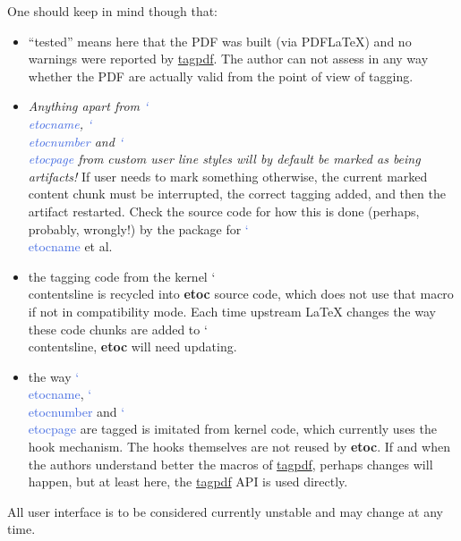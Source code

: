 \documentclass{article}
\DeclareRobustCommand\csa [1]
                {{\ttfamily\hyphenchar\font45 \char`\\ #1}}
\def\csb#1{\textcolor{RoyalBlue}{\csa{#1}}}
\newcommand\etoc{%
        \texorpdfstring{{\color{joli}\ttfamily\bfseries etoc}}{etoc}\xspace}
\DeclareRobustCommand\ctanpkg[1]
      {\texorpdfstring{\href{https://ctan.org/pkg/#1}{#1}}{#1}}
\begin{document}
\begin{itemize}
  One should keep in mind though that:
  \begin{itemize}
  \item ``tested'' means here that the PDF was built (via PDF\LaTeX) and
    no warnings were reported by \ctanpkg{tagpdf}.  The author can not
    assess in any way whether the PDF are actually valid from the point
    of view of tagging.
  \item \emph{Anything apart from \emph{\csb{etocname}},
      \emph{\csb{etocnumber}} and \emph{\csb{etocpage}} from custom user
      line styles will by default be marked as being artifacts!}  If
    user needs to mark something otherwise, the current marked content
    chunk must be interrupted, the correct tagging added, and then the
    artifact restarted. Check the source code for how this is done
    (perhaps, probably, wrongly!) by
    the package for \csb{etocname} et al.
  \item the tagging code from the kernel \csa{contentsline} is recycled
    into \etoc source code, which does not use that macro if not in
    compatibility mode.  Each time upstream \LaTeX{} changes the way
    these code chunks are added to \csa{contentsline}, \etoc will need
    updating.
  \item the way \csb{etocname}, \csb{etocnumber} and \csb{etocpage} are
    tagged is imitated from kernel code, which currently uses the hook
    mechanism.  The hooks themselves are not reused by \etoc.  If and
    when the authors understand better the macros of \ctanpkg{tagpdf},
    perhaps changes will happen, but at least here, the \ctanpkg{tagpdf}
    API is used directly.
  \end{itemize}
\end{itemize}

\begingroup{}
\begin{shaded}
  All user interface is to be considered currently unstable and may change at
any time.
\end{shaded}
\endgroup
\end{document}
